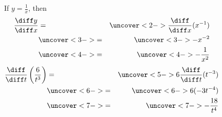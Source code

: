 \begin{frame}
\begin{example}[Example 9, p. 142]
\begin{columns}[c]
If $y = \frac{1}{x}$, then
\abovedisplayskip=0pt
\belowdisplayskip=0pt
\begin{eqnarray*}
\frac{\diff y}{\diff x} & = & %
\uncover<2->{\frac{\diff}{\diff x} (x^{-1})}\\
& \uncover<3->{ = } & %
\uncover<3->{-x^{-2}}\\
& \uncover<4->{ = } & %
\uncover<4->{-\frac{1}{x^2}}
\end{eqnarray*}
\abovedisplayskip=0pt
\belowdisplayskip=0pt
\begin{eqnarray*}
\frac{\diff}{\diff t}\left( \frac{6}{t^3}\right) & = & %
\uncover<5->{6\frac{\diff}{\diff t}(t^{-3})}\\
& \uncover<6->{ = } & %
\uncover<6->{6(-3t^{-4})}\\
& \uncover<7->{ = } & %
\uncover<7->{-\frac{18}{t^{4}}}\\
\end{eqnarray*}
\end{columns}
\end{example}
\end{frame}
